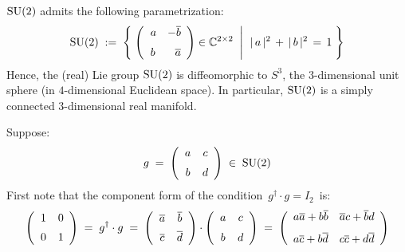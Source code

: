 \vskip 0.5cm
\begin{proposition}
\mbox{}
\vskip 0.1cm
\noindent
$\textnormal{SU}(2)$ admits the following parametrization:
\begin{equation*}
\textnormal{SU}{(2)}
\; := \;
	\left\{\,
		\left.
		\left(\begin{array}{rr}
		a & -\overline{b}
		\\
		\overset{{\color{white}-}}{b} & \overline{a}
		\end{array}\right)
		\overset{{\color{white}.}}{\in}
		\C^{2 \times 2}
		\;\;\right\vert\;\,
			\vert\, a \,\vert^{2} \,+\, \vert\, b \,\vert^{2} \,=\, 1
		\;\right\}
\end{equation*}
Hence, the (real) Lie group $\textnormal{SU}(2)$ is diffeomorphic to $S^{3}$, the $3$-dimensional unit sphere
(in $4$-dimensional Euclidean space).
In particular, $\textnormal{SU}(2)$ is a simply connected $3$-dimensional real manifold.
\end{proposition}
\proof
Suppose:
\begin{equation*}
g
\; = \;
	\left(\begin{array}{cc}
		a & c
		\\
		\overset{{\color{white}-}}{b} & d
		\end{array}\right)
\; \in \;
\textnormal{SU}(2)
\end{equation*}
First note that the component form of the condition \,$g^{\dagger}\cdot g = I_{2}$\, is:
\begin{equation*}
\left(\begin{array}{cc}
	1 & 0
	\\
	\overset{{\color{white}-}}{0} & 1
	\end{array}\right)
\; = \;
	g^{\dagger} \cdot g
\; = \;
	\left(\begin{array}{cc}
		\overline{a} & \overline{b}
		\\
		\overset{{\color{white}-}}{\overline{c}} & \overline{d}
		\end{array}\right)
	\cdot
	\left(\begin{array}{cc}
		a & c
		\\
		\overset{{\color{white}-}}{b} & d
		\end{array}\right)
\; = \;
	\left(\begin{array}{cc}
		a\overline{a} + b\overline{b} & \overline{a}c + \overline{b}d
		\\
		\overset{{\color{white}-}}{a\overline{c} + b\overline{d}} & c\overline{c} + d\overline{d}
		\end{array}\right)
\end{equation*}
